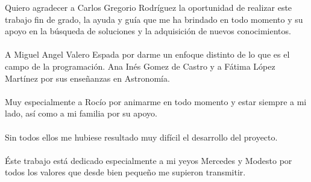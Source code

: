 	Quiero agradecer a Carlos Gregorio Rodríguez la oportunidad de realizar este trabajo fin de grado, la ayuda y guía que me ha brindado en todo momento y su apoyo en la búsqueda de soluciones y la adquisición de nuevos conocimientos.\\ 
	\\ A Miguel Angel Valero Espada por darme un enfoque distinto de lo que es el campo de la programación. Ana Inés Gomez de Castro y a Fátima López Martínez por sus enseñanzas en Astronomía.\\
	\\ Muy especialmente a Rocío por animarme en todo momento y estar siempre a mi lado, así como a mi familia por su apoyo.\\
	\\ Sin todos ellos me hubiese resultado muy difícil el desarrollo del proyecto.
	\\
	\\Éste trabajo está dedicado especialmente a mi yeyos Mercedes y Modesto por todos los valores que desde bien pequeño me supieron transmitir.
	\newpage

